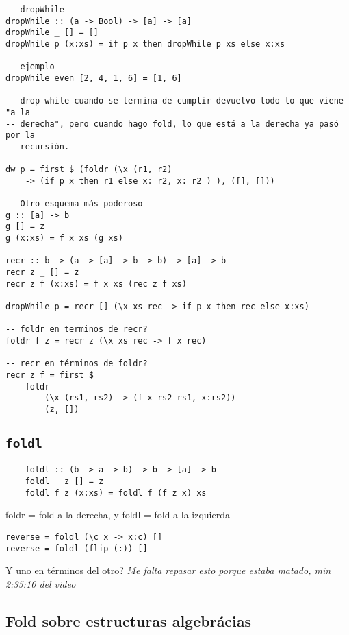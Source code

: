 \documentclass{report}
\theoremstyle{definition} %
\begin{document}
\begin{verbatim}
-- dropWhile
dropWhile :: (a -> Bool) -> [a] -> [a]
dropWhile _ [] = []
dropWhile p (x:xs) = if p x then dropWhile p xs else x:xs

-- ejemplo
dropWhile even [2, 4, 1, 6] = [1, 6]

-- drop while cuando se termina de cumplir devuelvo todo lo que viene "a la
-- derecha", pero cuando hago fold, lo que está a la derecha ya pasó por la
-- recursión.

dw p = first $ (foldr (\x (r1, r2)
    -> (if p x then r1 else x: r2, x: r2 ) ), ([], []))

-- Otro esquema más poderoso
g :: [a] -> b
g [] = z
g (x:xs) = f x xs (g xs)

recr :: b -> (a -> [a] -> b -> b) -> [a] -> b
recr z _ [] = z
recr z f (x:xs) = f x xs (rec z f xs)

dropWhile p = recr [] (\x xs rec -> if p x then rec else x:xs)

-- foldr en terminos de recr?
foldr f z = recr z (\x xs rec -> f x rec)

-- recr en términos de foldr?
recr z f = first $
    foldr
        (\x (rs1, rs2) -> (f x rs2 rs1, x:rs2))
        (z, [])
\end{verbatim}

\subsection{\texttt{foldl}}

\begin{verbatim}
    foldl :: (b -> a -> b) -> b -> [a] -> b
    foldl _ z [] = z
    foldl f z (x:xs) = foldl f (f z x) xs
\end{verbatim}

foldr = fold a la derecha, y foldl = fold a la izquierda

\begin{verbatim}
reverse = foldl (\c x -> x:c) []
reverse = foldl (flip (:)) []
\end{verbatim}

Y uno en términos del otro? \textit{Me falta repasar esto porque estaba matado,
min 2:35:10 del video}

\subsection{Fold sobre estructuras algebrácias}
\end{document}
